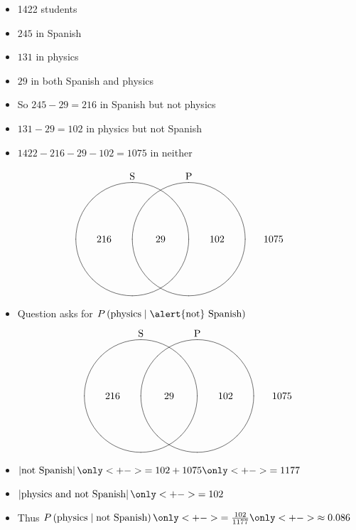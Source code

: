 \documentclass[handout]{beamer}
\theoremstyle{definition}
\begin{document}
\begin{frame}
\begin{itemize}
\item 1422 students
\item $245$ in Spanish
\item $131$ in physics
\item $29$ in both Spanish and physics
\item So $245-29=216$ in Spanish but not physics
\item $131-29=102$ in physics but not Spanish
\item $1422-216-29-102=1075$ in neither
\end{itemize}
\[\begin{xy}<1cm,0cm>:
(-1,2)*+!D{\text{S}};
(1,2)*+!D{\text{P}};
(-1,0)*\cir<2cm>{};
(1,0)*\cir<2cm>{};
(0,0)*{29};
(-2,0)*{216};
(2,0)*{102};
(4,0)*{1075};
\end{xy}\]
\end{frame}

\begin{frame}
\begin{itemize}
\item Question asks for $P\left(\text{physics}\mid
\text{\alert{not} Spanish}\right)$
\[\begin{xy}<1cm,0cm>:
(-1,2)*+!D{\text{S}};
(1,2)*+!D{\text{P}};
(-1,0)*\cir<2cm>{};
(1,0)*\cir<2cm>{};
(0,0)*{29};
(-2,0)*{216};
(2,0)*{102};
(4,0)*{1075};
\end{xy}\]
\item $\left|\text{not Spanish}\right|
\only<+->{=102+1075}\only<+->{=1177}$
\item $\left|\text{physics and not Spanish}\right|
\only<+->{=102}$
\item Thus
$P\left(\text{physics}\mid
\text{not Spanish}\right)\only<+->{=\frac{102}{1177}}
\only<+->{\approx 0.086}$
\end{itemize}
\end{frame}
\end{document}
